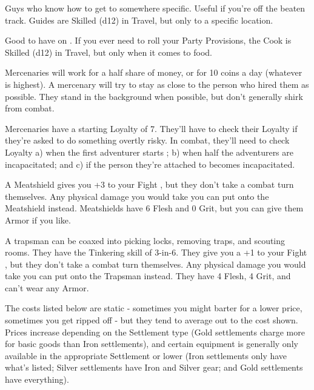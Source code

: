 {\begin{multicols}{2}

    Guys who know how to get to somewhere specific. Useful if you're  off the beaten track. Guides are Skilled (d12) in Travel, but only to a specific location.


    Good to have on .  If you ever need to roll your Party Provisions, the Cook is Skilled (d12) in Travel, but only when it comes to food.

    \cbreak


    Mercenaries will work for a half share of money, or for 10 coins a day (whatever is highest).  A mercenary will try to stay as close to the person who hired them as possible.  They stand in the background when possible, but don't generally shirk from combat.

    Mercenaries have a starting Loyalty of 7. They'll have to check their Loyalty if they're asked to do something overtly risky.  In combat, they'll need to check Loyalty a) when the first adventurer starts ; b) when half the adventurers are incapacitated; and c) if the person they're attached to becomes incapacitated.


    A Meatshield gives you +3 to your Fight \RO, but they don't take a combat turn themselves.  Any physical damage you would take you can put onto the Meatshield instead.  Meatshields have 6 Flesh and 0 Grit, but you can give them Armor if you like.


    A trapsman can be coaxed into picking locks, removing traps, and scouting rooms.  They have the Tinkering skill of 3-in-6.  They give you a +1 to your Fight \RO, but they don't take a combat turn themselves.  Any physical damage you would take you can put onto the Trapsman instead.  They have 4 Flesh, 4 Grit, and can't wear any Armor.

\newpage

\end{multicols}


  The costs listed below are static - sometimes you might barter for a lower price, sometimes you get ripped off - but they tend to average out to the cost shown.   Prices increase depending on the Settlement type (Gold settlements charge more for basic goods than Iron settlements), and certain equipment is generally only available in the appropriate Settlement or lower (Iron settlements only have what's listed; Silver settlements have Iron and Silver gear; and Gold settlements have everything). 

}
